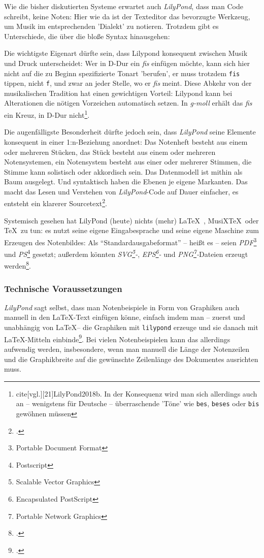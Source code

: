 Wie die bisher diskutierten Systeme erwartet auch \emph{LilyPond}, dass man Code
schreibt, keine Noten: Hier wie da ist der Texteditor das bevorzugte Werkzeug,
um Musik im entsprechenden 'Dialekt' zu notieren. Trotzdem gibt es Unterschiede,
die über die bloße Syntax hinausgehen:

Die wichtigste Eigenart dürfte sein, dass Lilypond konsequent zwischen Musik und
Druck unterscheidet: Wer in D-Dur ein \emph{fis} einfügen möchte, kann sich hier
nicht auf die zu Beginn spezifizierte Tonart 'berufen', er muss trotzdem
\texttt{fis} tippen, nicht \texttt{f}, und zwar an jeder Stelle, wo er
\emph{fis} meint. Diese Abkehr von der musikalischen Tradition hat einen
gewichtigen Vorteil: Lilypond kann bei Alterationen die nötigen Vorzeichen
automatisch setzen. In \emph{g-moll} erhält das \emph{fis} ein Kreuz, in D-Dur
nicht\footnote{cite[vgl.][21]{LilyPond2018b}. In der Konsequenz wird man sich
allerdings auch an -- wenigstens für Deutsche -- überraschende 'Töne' wie
\texttt{bes}, \texttt{beses} oder \texttt{bis} gewöhnen müssen}.

Die augenfälligste Besonderheit dürfte jedoch sein, dass \emph{LilyPond} seine
Elemente konsequent in einer 1:n-Beziehung anordnet: Das Notenheft besteht aus
einem oder mehreren Stücken, das Stück besteht aus einem oder mehreren
Notensystemen, ein Notensystem besteht aus einer oder mehrerer Stimmen, die
Stimme kann solistisch oder akkordisch sein. Das Datenmodell ist mithin als Baum
ausgelegt. Und syntaktisch haben die Ebenen je eigene Markanten. Das macht das
Lesen und Verstehen von \emph{LilyPond}-Code auf Dauer einfacher, es entsteht ein
klarerer Sourcetext\footcite[vgl.][40ff]{LilyPond2018b}.

Systemisch gesehen hat LilyPond (heute) nichts (mehr) \LaTeX\ , MusiX\TeX\ oder
\TeX\ zu tun: es nutzt seine eigene Eingabesprache und seine eigene Maschine zum
Erzeugen des Notenbildes: Als \enquote{Standardausgabeformat} -- heißt es --
seien \emph{PDF}\footnote{Portable Document Format} und
\emph{PS}\footnote{Postscript} gesetzt; außerdem könnten
\emph{SVG\footnote{Scalable Vector Graphics}-}, \emph{EPS\footnote{Encapsulated
PostScript}-} und \emph{PNG\footnote{Portable Network Graphics}-}Dateien erzeugt
werden\footcite[vgl.][481]{LilyPond2018c}.

\subsubsection{Technische Voraussetzungen}

\emph{LilyPond} sagt selbst, dass man Notenbeispiele in Form von Graphiken auch
manuell in den \LaTeX-Text einfügen könne, einfach imdem man -- zuerst und
unabhängig von \LaTeX -- die Graphiken mit \texttt{lilypond} erzeuge und sie
danach mit \LaTeX-Mitteln einbinde\footcite[vgl.][20]{LilyPond2018e}. Bei vielen
Notenbeispielen kann das allerdings aufwendig werden, insbesondere, wenn man
manuell die Länge der Notenzeilen und die Graphikbreite auf die gewünschte
Zeilenlänge des Dokumentes ausrichten muss.

